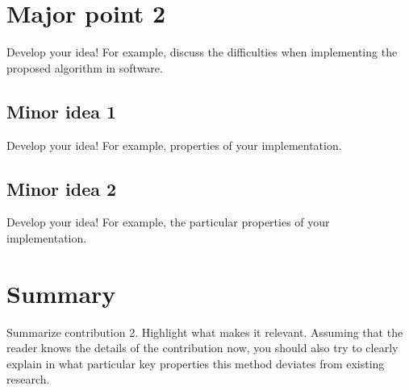 \section{Major point 2}
\label{s:Contribution-2-Major-2}
Develop your idea! For example, discuss the difficulties when implementing the proposed algorithm in software.

\subsection{Minor idea 1}
\label{s:Contribution-2-Major-2-Minor-1}
Develop your idea! For example, properties of your implementation.




\subsection{Minor idea 2}
\label{s:Contribution-2-Major-2-Minor-2}
Develop your idea! For example, the particular properties of your implementation.




\section{Summary}
\label{s:Contribution-2-Summary}

Summarize contribution 2. Highlight what makes it relevant. Assuming that the reader knows the details of the contribution now, you should also try to clearly explain in what particular key properties this method deviates from existing research.

